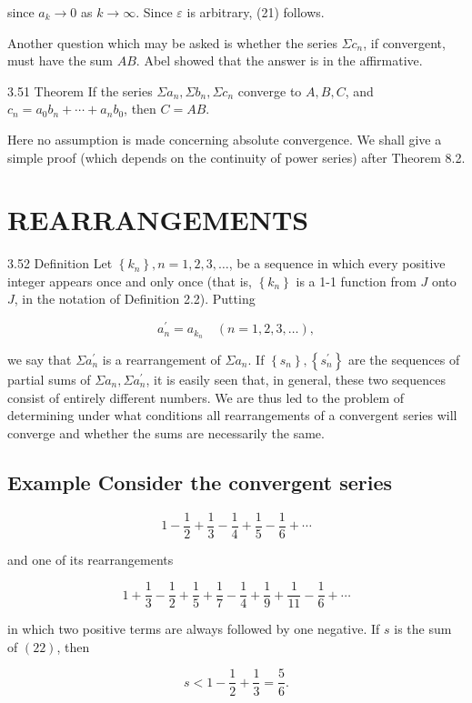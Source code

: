 \documentclass[10pt]{article}
\begin{document}
since $a_{k} \rightarrow 0$ as $k \rightarrow \infty$. Since $\varepsilon$ is arbitrary, (21) follows.

Another question which may be asked is whether the series $\Sigma c_{n}$, if convergent, must have the sum $A B$. Abel showed that the answer is in the affirmative.

3.51 Theorem If the series $\Sigma a_{n}, \Sigma b_{n}, \Sigma c_{n}$ converge to $A, B, C$, and $c_{n}=a_{0} b_{n}+\cdots+a_{n} b_{0}$, then $C=A B$.

Here no assumption is made concerning absolute convergence. We shall give a simple proof (which depends on the continuity of power series) after Theorem 8.2.

\section{REARRANGEMENTS}
3.52 Definition Let $\left\{k_{n}\right\}, n=1,2,3, \ldots$, be a sequence in which every positive integer appears once and only once (that is, $\left\{k_{n}\right\}$ is a 1-1 function from $J$ onto $J$, in the notation of Definition 2.2). Putting

$$
a_{n}^{\prime}=a_{k_{n}} \quad(n=1,2,3, \ldots),
$$

we say that $\Sigma a_{n}^{\prime}$ is a rearrangement of $\Sigma a_{n}$. If $\left\{s_{n}\right\},\left\{s_{n}^{\prime}\right\}$ are the sequences of partial sums of $\Sigma a_{n}, \Sigma a_{n}^{\prime}$, it is easily seen that, in general, these two sequences consist of entirely different numbers. We are thus led to the problem of determining under what conditions all rearrangements of a convergent series will converge and whether the sums are necessarily the same.

\subsection{Example Consider the convergent series}
$$
1-\frac{1}{2}+\frac{1}{3}-\frac{1}{4}+\frac{1}{5}-\frac{1}{6}+\cdots
$$

and one of its rearrangements

$$
1+\frac{1}{3}-\frac{1}{2}+\frac{1}{5}+\frac{1}{7}-\frac{1}{4}+\frac{1}{9}+\frac{1}{11}-\frac{1}{6}+\cdots
$$

in which two positive terms are always followed by one negative. If $s$ is the sum of $(22)$, then

$$
s<1-\frac{1}{2}+\frac{1}{3}=\frac{5}{6} .
$$
\end{document}
